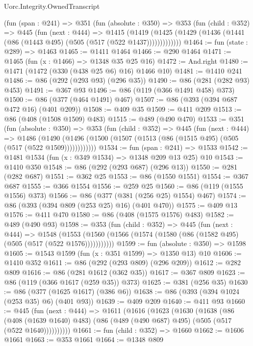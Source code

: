 \begin{lexlean}{Uorc.Integrity.OwnedTranscript}
\begin{coremodule}
    (fun (span : @241) =>
    @351
      (fun (absolute : @350) =>
      @353
        (fun (child : @352) =>
        @445
          (fun (next : @444) =>
          @1415
            (@1419
              (@1425 (@1429 (@1436 (@1441 (@86 (@1443 @495) (@505 (@517 (@522 @1437)))))))))))))
@1464 := fun (state : @289) => @1463
@1465 := @1411 @1464
@1466 := @290 @1464
@1471 := @1465 (fun (x : @1466) => @1348 @35 @25 @16)
@1472 := And.right
@1480 := @1471 (@1472 (@330 (@438 @25 @6) @16) @1466 @10)
@1481 := @1410 @241
@1486 := @86 (@292 (@293 @93) (@296 @35))
@1490 := @86 (@281 (@282 @93) @453)
@1491 := @367 @93
@1496 := @86 (@119 (@366 @1491 @458) @373)
@1500 := @86 (@377 (@464 @1491) @467)
@1507 := @86 (@393 (@394 @687 @472 @16) (@401 @209))
@1508 := @409 @35
@1509 := @411 @209
@1513 := @86 (@408 (@1508 @1509) @483)
@1515 := @489 (@490 @470)
@1533 := @351
    (fun (absolute : @350) =>
    @353
      (fun (child : @352) =>
      @445
        (fun (next : @444) =>
        @1486
          (@1490 (@1496 (@1500 (@1507 (@1513 (@86 (@1515 @495) (@505 (@517 (@522 @1509))))))))))))
@1534 := fun (span : @241) => @1533
@1542 := @1481 @1534 (fun (x : @349 @1534) => @1348 @209 @13 @25) @10
@1543 := @1410 @350
@1548 := @86 (@292 (@293 @687) (@296 @13))
@1550 := @281 (@282 @687)
@1551 := @362 @25
@1553 := @86 (@1550 @1551)
@1554 := @367 @687
@1555 := @366 @1554
@1556 := @259 @25
@1560 := @86 (@119 (@1555 @1556) @373)
@1566 := @86 (@377 (@381 (@256 @25) @1554) @467)
@1574 := @86 (@393 (@394 @809 (@253 @25) @16) (@401 @470))
@1575 := @409 @13
@1576 := @411 @470
@1580 := @86 (@408 (@1575 @1576) @483)
@1582 := @489 (@490 @93)
@1598 := @353
    (fun (child : @352) =>
    @445
      (fun (next : @444) =>
      @1548 (@1553 (@1560 (@1566 (@1574 (@1580 (@86 (@1582 @495) (@505 (@517 (@522 @1576)))))))))))
@1599 := fun (absolute : @350) => @1598
@1605 := @1543 @1599 (fun (x : @351 @1599) => @1350 @13) @10
@1606 := @1410 @352
@1611 := @86 (@292 (@293 @809) (@296 @209))
@1612 := @282 @809
@1616 := @86 (@281 @1612 (@362 @35))
@1617 := @367 @809
@1623 := @86 (@119 (@366 @1617 (@259 @35)) @373)
@1625 := @381 (@256 @35)
@1630 := @86 (@377 (@1625 @1617) (@386 @6))
@1638 := @86 (@393 (@394 @1024 (@253 @35) @6) (@401 @93))
@1639 := @409 @209
@1640 := @411 @93
@1660 := @445
    (fun (next : @444) =>
    @1611
      (@1616
        (@1623
          (@1630
            (@1638
              (@86
                (@408 (@1639 @1640) @483)
                (@86 (@489 (@490 @687) @495) (@505 (@517 (@522 @1640))))))))))
@1661 := fun (child : @352) => @1660
@1662 := @1606 @1661
@1663 := @353 @1661
@1664 := @1348 @809

\end{coremodule}
\end{lexlean}
